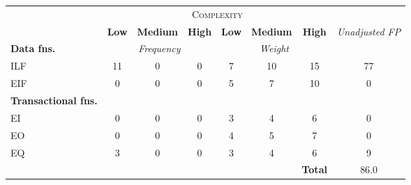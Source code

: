 
\begin{tabular}{|l|c|c|c|c|c|c|c|}
\cline{2-7}
\multicolumn{1}{c}{} & \multicolumn{6}{|c|}{\textsc{Complexity}} & \multicolumn{1}{c}{}  \\ \cline{2-8}
\multicolumn{1}{c|}{} & \textbf{Low} & \textbf{Medium} & \textbf{High} & \textbf{Low} & \textbf{Medium} & \textbf{High} & \multirow{2}{*}{\textit{Unadjusted FP}} \\ \cline{1-7}
\textbf{Data fns.} & \multicolumn{3}{|c|}{\textit{Frequency}} &  \multicolumn{3}{|c|}{\textit{Weight}} & \\ \hline
ILF 	& 11 & 0 & 0 & 7 & 10 & 15 & 77 	\\ \hline
EIF 	& 0 & 0 & 0 & 5 & 7 & 10 & 0		\\ \hline
\textbf{Transactional fns.} & \multicolumn{7}{|c|}{} \\ \hline
EI 		& 0 & 0 & 0 & 3 & 4 & 6 & 0 		\\ \hline
EO 		& 0 & 0 & 0 & 4 & 5 & 7 & 0		\\ \hline
EQ		& 3 & 0 & 0 & 3 & 4 & 6 & 9		\\ \hline
\multicolumn{6}{c|}{} & \textbf{Total} & 86.0 \\ \cline{7-8}
\end{tabular}
